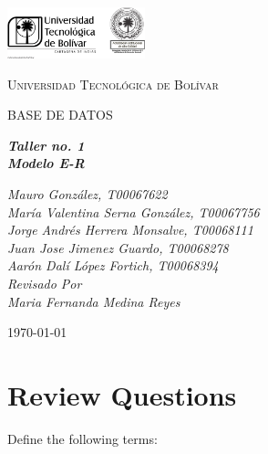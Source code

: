\documentclass[letterpaper, 12pt]{report}
\begin{document}
\begin{titlepage}
	\centering
	\includegraphics[width=0.3\textwidth]{Images/logo_utb.png}\par\vspace{1cm}
	{\scshape\LARGE Universidad Tecnológica de Bolívar \par}
	\vspace{.5cm}

	{\scshape\Large BASE DE DATOS \par}
	\vspace{.7cm}

	\slshape {\Large \bfseries{}Taller no. 1\\}
	\slshape {\small \bfseries{}Modelo E-R}
	\vspace{.6cm}

	\slshape {\itshape{} Mauro González, T00067622 \\}
	\slshape {\itshape{} María Valentina Serna González, T00067756 \\}
	\slshape {\itshape{} Jorge Andrés Herrera Monsalve, T00068111 \\}
	\slshape {\itshape{} Juan Jose Jimenez Guardo, T00068278 \\}
	\slshape {\itshape{} Aarón Dalí López Fortich, T00068394 \\}
	\vfill
	Revisado Por \\
	Maria Fernanda Medina Reyes\\
	{\large \today\par}
\end{titlepage}

\section{Review Questions}

Define the following terms:
\end{document}

